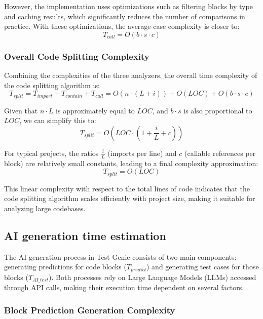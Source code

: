 However, the implementation uses optimizations such as filtering blocks by type and caching results, which significantly reduces the number of comparisons in practice. With these optimizations, the average-case complexity is closer to:
\begin{equation}
T_{call} = O(b \cdot s \cdot c)
\end{equation}

\subsubsection{Overall Code Splitting Complexity}

Combining the complexities of the three analyzers, the overall time complexity of the code splitting algorithm is:
\begin{equation}
T_{split} = T_{import} + T_{contain} + T_{call} = O(n \cdot (L + i)) + O(LOC) + O(b \cdot s \cdot c)
\end{equation}

Given that $n \cdot L$ is approximately equal to $LOC$, and $b \cdot s$ is also proportional to $LOC$, we can simplify this to:
\begin{equation}
T_{split} = O(LOC \cdot (1 + \frac{i}{L} + c))
\end{equation}

For typical projects, the ratios $\frac{i}{L}$ (imports per line) and $c$ (callable references per block) are relatively small constants, leading to a final complexity approximation:
\begin{equation}
T_{split} = O(LOC)
\end{equation}

This linear complexity with respect to the total lines of code indicates that the code splitting algorithm scales efficiently with project size, making it suitable for analyzing large codebases.

\subsection{AI generation time estimation}

The AI generation process in Test Genie consists of two main components: generating predictions for code blocks ($T_{predict}$) and generating test cases for those blocks ($T_{AI\_test}$). Both processes rely on Large Language Models (LLMs) accessed through API calls, making their execution time dependent on several factors.

\subsubsection{Block Prediction Generation Complexity}

